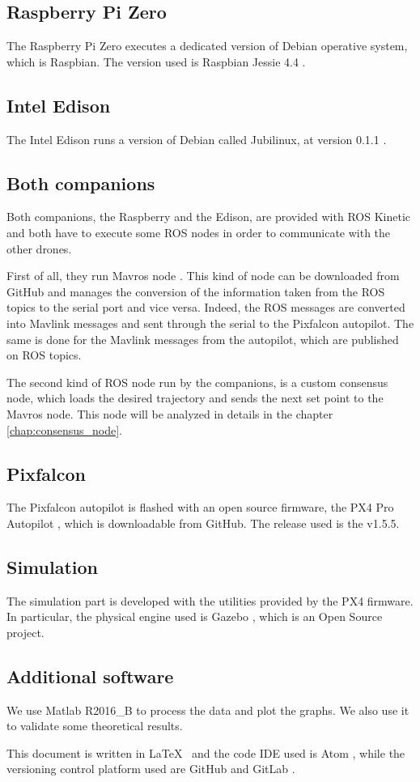 \subsection{Raspberry Pi Zero}
The Raspberry Pi Zero executes a dedicated version of Debian operative system,
which is Raspbian. The version used is Raspbian Jessie 4.4 \cite{raspbian}.

\subsection{Intel Edison}
The Intel Edison runs a version of Debian called Jubilinux, at version 0.1.1 \cite{jubilinux}.

\subsection{Both companions}
Both companions, the Raspberry and the Edison, are provided with ROS Kinetic and
both have to execute some ROS nodes in order to communicate with the other drones.

First of all, they run Mavros node \cite{mavros}.
This kind of node can be downloaded from GitHub and manages the conversion of the
information taken from the ROS topics to the serial port and vice versa. Indeed,
the ROS messages are converted into Mavlink messages and sent through the serial
to the Pixfalcon autopilot. The same is done for the Mavlink messages from the
autopilot, which are published on ROS topics.

The second kind of ROS node run by the companions, is a custom consensus node, which
loads the desired trajectory and sends the next set point to the Mavros node.
This node will be analyzed in details in the chapter \ref{chap:consensus_node}.

\subsection{Pixfalcon}
The Pixfalcon autopilot is flashed with an open source firmware,
the PX4 Pro Autopilot \cite{px4}, which is downloadable from GitHub.
The release used is the v1.5.5.

\subsection{Simulation}
The simulation part is developed with the utilities provided by the PX4 firmware.
In particular, the physical engine used is Gazebo \cite{gazebo}, which is an Open
Source project.

\subsection{Additional software}
We use Matlab R2016\_B \cite{matlab} to process the data and plot the graphs.
We also use it to validate some theoretical results.

This document is written in  \LaTeX \ \cite{latex} and the code IDE used is Atom \cite{atom},
while the versioning control platform used are GitHub \cite{github} and GitLab \cite{gitlab}.
